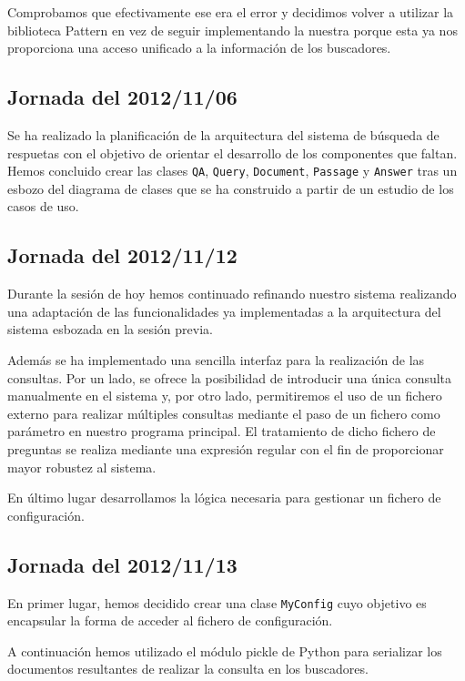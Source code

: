 \documentclass[12pt,a4paper,titlepage]{article}
\begin{document}
Comprobamos que efectivamente ese era el error y decidimos volver a utilizar la biblioteca Pattern en vez de seguir implementando la nuestra porque esta ya nos proporciona una acceso unificado a la información de los buscadores.

\subsection{Jornada del 2012/11/06}
Se ha realizado la planificación de la arquitectura del sistema de búsqueda de respuetas con el objetivo de orientar el desarrollo de los componentes que faltan. Hemos concluido crear las clases \texttt{QA}, \texttt{Query}, \texttt{Document}, \texttt{Passage} y \texttt{Answer} tras un esbozo del diagrama de clases que se ha construido a partir de un estudio de los casos de uso.

\subsection{Jornada del 2012/11/12}
Durante la sesión de hoy hemos continuado refinando nuestro sistema realizando una adaptación de las funcionalidades ya implementadas a la arquitectura del sistema esbozada en la sesión previa.

Además se ha implementado una sencilla interfaz para la realización de las consultas. Por un lado, se ofrece la posibilidad de introducir una única consulta manualmente en el sistema y, por otro lado, permitiremos el uso de un fichero externo para realizar múltiples consultas mediante el paso de un fichero como parámetro en nuestro programa principal. El tratamiento de dicho fichero de preguntas se realiza mediante una expresión regular con el fin de proporcionar mayor robustez al sistema.

En último lugar desarrollamos la lógica necesaria para gestionar un fichero de configuración.

\subsection{Jornada del 2012/11/13}
En primer lugar, hemos decidido crear una clase \texttt{MyConfig} cuyo objetivo es encapsular la forma de acceder al fichero de configuración.

A continuación hemos utilizado el módulo pickle de Python para serializar los documentos resultantes de realizar la consulta en los buscadores.
\end{document}
